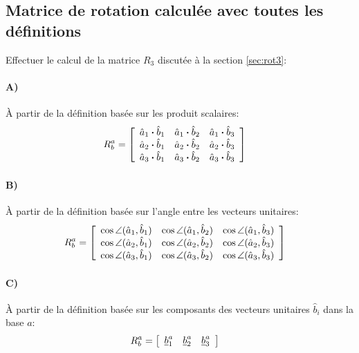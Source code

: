 \subsection{Matrice de rotation calculée avec toutes les définitions}

Effectuer le calcul de la matrice $R_3$ discutée à la section \ref{sec:rot3}:

\paragraph{A)} À partir de la définition basée sur les produit scalaires:
\begin{align}
R_b^a &= 
\left[ \begin{array}{c c c} 
\hat{a}_1 \bullet \hat{b}_1  &  \hat{a}_1 \bullet \hat{b}_2  &  \hat{a}_1 \bullet \hat{b}_3 \\
\hat{a}_2 \bullet \hat{b}_1  &  \hat{a}_2 \bullet \hat{b}_2  &  \hat{a}_2 \bullet \hat{b}_3 \\
\hat{a}_3 \bullet \hat{b}_1  &  \hat{a}_3 \bullet \hat{b}_2  &  \hat{a}_3 \bullet \hat{b}_3 
\end{array} \right] 
\end{align} 
\paragraph{B)} À partir de la définition basée sur l'angle entre les vecteurs unitaires:
\begin{align}
R_b^a &= 
\left[ \begin{array}{c c c} 
\cos \angle (\hat{a}_1 , \hat{b}_1)  &  \cos \angle (\hat{a}_1 , \hat{b}_2)  &  \cos \angle (\hat{a}_1 , \hat{b}_3) \\
\cos \angle (\hat{a}_2 , \hat{b}_1)  &  \cos \angle (\hat{a}_2 , \hat{b}_2)  &  \cos \angle (\hat{a}_2 , \hat{b}_3) \\
\cos \angle (\hat{a}_3 , \hat{b}_1)  &  \cos \angle (\hat{a}_3 , \hat{b}_2)  &  \cos \angle (\hat{a}_3 , \hat{b}_3) 
\end{array} \right] 
\end{align} 
\paragraph{C)} À partir de la définition basée sur les composants des vecteurs unitaires $\hat{b}_i$ dans la base $a$:
\begin{align}
R_b^a &= 
\left[ \begin{array}{c c c} 
\col{b}_1^a &  \col{b}_2^a & \col{b}_3^a
\end{array} \right] 
\end{align} 

